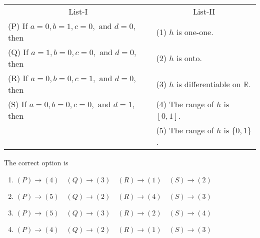 \documentclass[12pt,a4paper]{article}
\begin{document}
\begin{enumerate}
\begin{tabular}{ll}
\multicolumn{1}{c}{List-I} & \multicolumn{1}{c}{List-II} \\
(P) If $a=0, b=1, c=0,$ and $d=0$, then & (1) $h$ is one-one. \\
(Q) If $a=1, b=0, c=0,$ and $d=0$, then & (2) $h$ is onto. \\
(R) If $a=0, b=0, c=1,$ and $d=0$, then & (3) $h$ is differentiable on $\mathbb{R}$. \\
(S) If $a=0, b=0, c=0,$ and $d=1$, then & (4) The range of $h$ is $[0,1]$. \\
 & (5) The range of $h$ is $\{0,1\}$. 
\end{tabular}
The correct option is
\begin{enumerate}
    \item $ (P) \to (4) \quad (Q) \to (3) \quad (R) \to (1) \quad (S) \to (2) $
    \item $ (P) \to (5) \quad (Q) \to (2) \quad (R) \to (4) \quad (S) \to (3) $
    \item $ (P) \to (5) \quad (Q) \to (3) \quad (R) \to (2) \quad (S) \to (4) $
    \item $ (P) \to (4) \quad (Q) \to (2) \quad (R) \to (1) \quad (S) \to (3) $
\end{enumerate} 
\end{enumerate}
\end{document}
